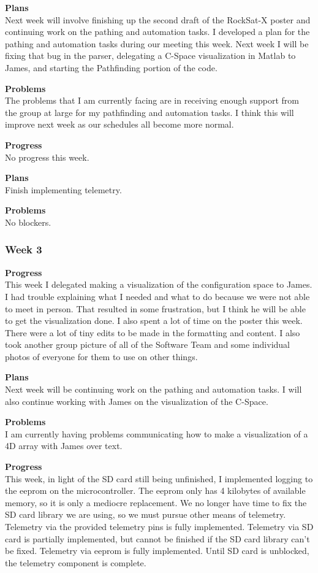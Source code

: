 \textbf{Plans} \\
Next week will involve finishing up the second draft of the RockSat-X poster and continuing work on the pathing and automation tasks. I developed a plan for the pathing and automation tasks during our meeting this week. Next week I will be fixing that bug in the parser, delegating a C-Space visualization in Matlab to James, and starting the Pathfinding portion of the code.

\textbf{Problems} \\
The problems that I am currently facing are in receiving enough support from the group at large for my pathfinding and automation tasks. I think this will improve next week as our schedules all become more normal.

\textbf{Progress} \\
No progress this week.

\textbf{Plans} \\
Finish implementing telemetry.

\textbf{Problems} \\
No blockers.

\subsubsection{Week 3}
\textbf{Progress} \\ 
This week I delegated making a visualization of the configuration space to James. I had trouble explaining what I needed and what to do because we were not able to meet in person. That resulted in some frustration, but I think he will be able to get the visualization done. I also spent a lot of time on the poster this week. There were a lot of tiny edits to be made in the formatting and content. I also took another group picture of all of the Software Team and some individual photos of everyone for them to use on other things.

\textbf{Plans} \\ 
Next week will be continuing work on the pathing and automation tasks. I will also continue working with James on the visualization of the C-Space.

\textbf{Problems} \\
I am currently having problems communicating how to make a visualization of a 4D array with James over text.

\textbf{Progress} \\
This week, in light of the SD card still being unfinished, I implemented logging to the eeprom on the microcontroller. The eeprom only has 4 kilobytes of available memory, so it is only a mediocre replacement. We no longer have time to fix the SD card library we are using, so we must pursue other means of telemetry. Telemetry via the provided telemetry pins is fully implemented. Telemetry via SD card is partially implemented, but cannot be finished if the SD card library can't be fixed. Telemetry via eeprom is fully implemented. Until SD card is unblocked, the telemetry component is complete.

